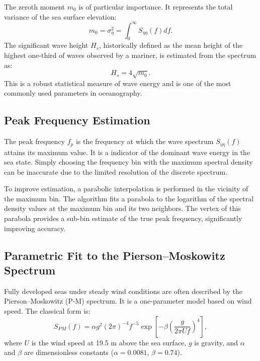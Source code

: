 \documentclass[11pt,letterpaper]{article}
\begin{document}
    The zeroth moment $m_0$ is of particular importance. It represents the total variance of the sea surface elevation:
    \begin{equation}
        m_0 = \sigma_\eta^2 = \int_{0}^{\infty} S_{\eta\eta}(f)  df.
    \end{equation}
    The significant wave height $H_s$, historically defined as the mean height of the highest one-third of waves observed by a mariner, is estimated from the spectrum as:
    \begin{equation}
        H_s = 4\sqrt{m_0}.
    \end{equation}
    This is a robust statistical measure of wave energy and is one of the most commonly used parameters in oceanography.

    \subsection{Peak Frequency Estimation}
    The peak frequency $f_p$ is the frequency at which the wave spectrum $S_{\eta\eta}(f)$ attains its maximum value. It is a indicator of the dominant wave energy in the sea state. Simply choosing the frequency bin with the maximum spectral density can be inaccurate due to the limited resolution of the discrete spectrum.

    To improve estimation, a parabolic interpolation is performed in the vicinity of the maximum bin. The algorithm fits a parabola to the logarithm of the spectral density values at the maximum bin and its two neighbors. The vertex of this parabola provides a sub-bin estimate of the true peak frequency, significantly improving accuracy.

    \subsection{Parametric Fit to the Pierson--Moskowitz Spectrum}
    \label{subsec:pmfit}
    Fully developed seas under steady wind conditions are often described by the Pierson--Moskowitz (P-M) spectrum. It is a one-parameter model based on wind speed. The classical form is:
    \begin{equation}
        \label{eq:pm_original}
        S_{PM}(f) = \alpha g^2 (2\pi)^{-4} f^{-5} \exp\left[-\beta\left(\frac{g}{2\pi U f}\right)^4\right],
    \end{equation}
    where $U$ is the wind speed at 19.5 m above the sea surface, $g$ is gravity, and $\alpha$ and $\beta$ are dimensionless constants ($\alpha=0.0081$, $\beta=0.74$).
\end{document}
